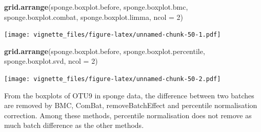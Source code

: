 \documentclass[]{book}
\newenvironment{Shaded}{\begin{snugshade}}{\end{snugshade}}
\newcommand{\KeywordTok}[1]{\textcolor[rgb]{0.13,0.29,0.53}{\textbf{#1}}}
\newcommand{\DataTypeTok}[1]{\textcolor[rgb]{0.13,0.29,0.53}{#1}}
\newcommand{\DecValTok}[1]{\textcolor[rgb]{0.00,0.00,0.81}{#1}}
\newcommand{\NormalTok}[1]{#1}
\begin{document}
\begin{Shaded}
\begin{Highlighting}[]
\KeywordTok{grid.arrange}\NormalTok{(sponge.boxplot.before, sponge.boxplot.bmc, }
\NormalTok{             sponge.boxplot.combat, sponge.boxplot.limma, }\DataTypeTok{ncol =} \DecValTok{2}\NormalTok{)}
\end{Highlighting}
\end{Shaded}

\texttt{[image: vignette\_files/figure-latex/unnamed-chunk-50-1.pdf]}

\begin{Shaded}
\begin{Highlighting}[]
\KeywordTok{grid.arrange}\NormalTok{(sponge.boxplot.before, sponge.boxplot.percentile, }
\NormalTok{             sponge.boxplot.svd, }\DataTypeTok{ncol =} \DecValTok{2}\NormalTok{)}
\end{Highlighting}
\end{Shaded}

\texttt{[image: vignette\_files/figure-latex/unnamed-chunk-50-2.pdf]}

From the boxplots of OTU9 in sponge data, the difference between two
batches are removed by BMC, ComBat, removeBatchEffect and percentile
normalisation correction. Among these methods, percentile normalisation
does not remove as much batch difference as the other methods.
\end{document}
